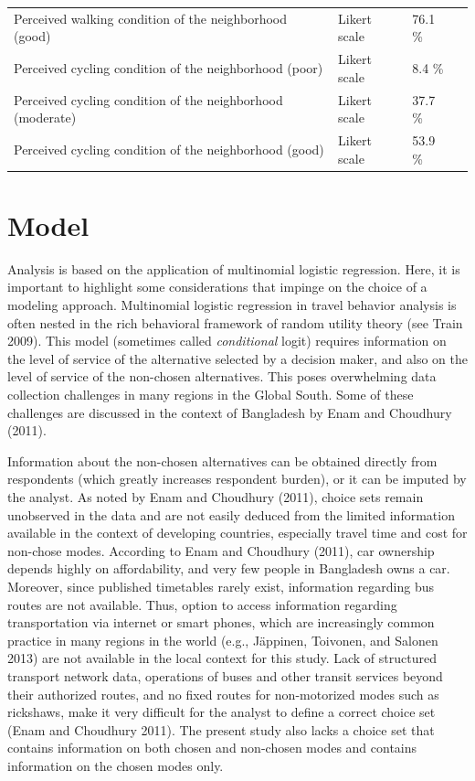 \documentclass[]{elsarticle} %
\begin{document}
\begin{table}
{\begin{tabular}[t]{llll}
\hspace{1em}Perceived walking condition of the neighborhood (good) & Likert scale & 76.1 \% & \\
\hspace{1em}Perceived cycling condition of the neighborhood (poor) & Likert scale & 8.4 \% & \\
\hspace{1em}Perceived cycling condition of the neighborhood (moderate) & Likert scale & 37.7 \% & \\
\hspace{1em}Perceived cycling condition of the neighborhood (good) & Likert scale & 53.9 \% & \\
\bottomrule
\end{tabular}}
\end{table}

\hypertarget{model}{%
\section{Model}\label{model}}

Analysis is based on the application of multinomial logistic regression.
Here, it is important to highlight some considerations that impinge on
the choice of a modeling approach. Multinomial logistic regression in
travel behavior analysis is often nested in the rich behavioral
framework of random utility theory (see Train 2009). This model
(sometimes called \emph{conditional} logit) requires information on the
level of service of the alternative selected by a decision maker, and
also on the level of service of the non-chosen alternatives. This poses
overwhelming data collection challenges in many regions in the Global
South. Some of these challenges are discussed in the context of
Bangladesh by Enam and Choudhury (2011).

Information about the non-chosen alternatives can be obtained directly
from respondents (which greatly increases respondent burden), or it can
be imputed by the analyst. As noted by Enam and Choudhury (2011), choice
sets remain unobserved in the data and are not easily deduced from the
limited information available in the context of developing countries,
especially travel time and cost for non-chose modes. According to Enam
and Choudhury (2011), car ownership depends highly on affordability, and
very few people in Bangladesh owns a car. Moreover, since published
timetables rarely exist, information regarding bus routes are not
available. Thus, option to access information regarding transportation
via internet or smart phones, which are increasingly common practice in
many regions in the world (e.g., Jäppinen, Toivonen, and Salonen 2013)
are not available in the local context for this study. Lack of
structured transport network data, operations of buses and other transit
services beyond their authorized routes, and no fixed routes for
non-motorized modes such as rickshaws, make it very difficult for the
analyst to define a correct choice set (Enam and Choudhury 2011). The
present study also lacks a choice set that contains information on both
chosen and non-chosen modes and contains information on the chosen modes
only.
\end{document}
